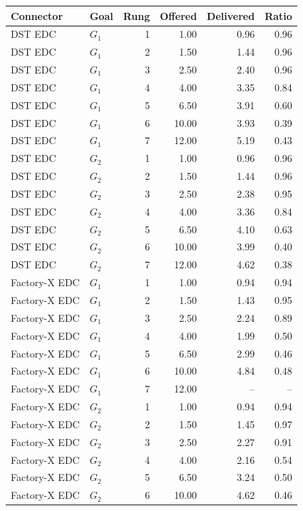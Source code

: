 \begin{tabular}{llrrrr}
    \toprule
    Connector & Goal & Rung & Offered & Delivered & Ratio \\
    \midrule
    DST EDC & $G_1$ & 1 & 1.00 & 0.96 & 0.96 \\
    DST EDC & $G_1$ & 2 & 1.50 & 1.44 & 0.96 \\
    DST EDC & $G_1$ & 3 & 2.50 & 2.40 & 0.96 \\
    DST EDC & $G_1$ & 4 & 4.00 & 3.35 & 0.84 \\
    DST EDC & $G_1$ & 5 & 6.50 & 3.91 & 0.60 \\
    DST EDC & $G_1$ & 6 & 10.00 & 3.93 & 0.39 \\
    DST EDC & $G_1$ & 7 & 12.00 & 5.19 & 0.43 \\
    DST EDC & $G_2$ & 1 & 1.00 & 0.96 & 0.96 \\
    DST EDC & $G_2$ & 2 & 1.50 & 1.44 & 0.96 \\
    DST EDC & $G_2$ & 3 & 2.50 & 2.38 & 0.95 \\
    DST EDC & $G_2$ & 4 & 4.00 & 3.36 & 0.84 \\
    DST EDC & $G_2$ & 5 & 6.50 & 4.10 & 0.63 \\
    DST EDC & $G_2$ & 6 & 10.00 & 3.99 & 0.40 \\
    DST EDC & $G_2$ & 7 & 12.00 & 4.62 & 0.38 \\
    Factory-X EDC & $G_1$ & 1 & 1.00 & 0.94 & 0.94 \\
    Factory-X EDC & $G_1$ & 2 & 1.50 & 1.43 & 0.95 \\
    Factory-X EDC & $G_1$ & 3 & 2.50 & 2.24 & 0.89 \\
    Factory-X EDC & $G_1$ & 4 & 4.00 & 1.99 & 0.50 \\
    Factory-X EDC & $G_1$ & 5 & 6.50 & 2.99 & 0.46 \\
    Factory-X EDC & $G_1$ & 6 & 10.00 & 4.84 & 0.48 \\
    Factory-X EDC & $G_1$ & 7 & 12.00 & -- & -- \\
    Factory-X EDC & $G_2$ & 1 & 1.00 & 0.94 & 0.94 \\
    Factory-X EDC & $G_2$ & 2 & 1.50 & 1.45 & 0.97 \\
    Factory-X EDC & $G_2$ & 3 & 2.50 & 2.27 & 0.91 \\
    Factory-X EDC & $G_2$ & 4 & 4.00 & 2.16 & 0.54 \\
    Factory-X EDC & $G_2$ & 5 & 6.50 & 3.24 & 0.50 \\
    Factory-X EDC & $G_2$ & 6 & 10.00 & 4.62 & 0.46 \\

\end{tabular}
